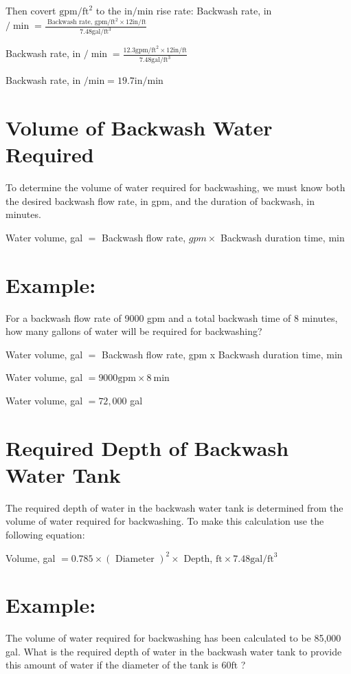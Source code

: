 \documentclass[10pt]{article}
\begin{document}
Then covert $\mathrm{gpm} / \mathrm{ft}^{2}$ to the $\mathrm{in} / \mathrm{min}$ rise rate: Backwash rate, in $/ \min =\frac{\text { Backwash rate, } \mathrm{gpm} / \mathrm{ft}^{2} \times 12 \mathrm{in} / \mathrm{ft}}{7.48 \mathrm{gal} / \mathrm{ft}^{3}}$

Backwash rate, in $/ \min =\frac{12.3 \mathrm{gpm} / \mathrm{ft}^{2} \times 12 \mathrm{in} / \mathrm{ft}}{7.48 \mathrm{gal} / \mathrm{ft}^{3}}$

Backwash rate, in $/ \mathrm{min}=19.7 \mathrm{in} / \mathrm{min}$

\section{Volume of Backwash Water Required}
To determine the volume of water required for backwashing, we must know both the desired backwash flow rate, in gpm, and the duration of backwash, in minutes.

Water volume, gal $=$ Backwash flow rate, $g p m \times$ Backwash duration time, min

\section{Example:}
For a backwash flow rate of 9000 gpm and a total backwash time of 8 minutes, how many gallons of water will be required for backwashing?

Water volume, gal $=$ Backwash flow rate, gpm x Backwash duration time, min

Water volume, gal $=9000 \mathrm{gpm} \times 8 \mathrm{~min}$

Water volume, gal $=72,000$ gal

\section{Required Depth of Backwash Water Tank}
The required depth of water in the backwash water tank is determined from the volume of water required for backwashing. To make this calculation use the following equation:

Volume, gal $=0.785 \times(\text { Diameter })^{2} \times$ Depth, $\mathrm{ft} \times 7.48 \mathrm{gal} / \mathrm{ft}^{3}$

\section{Example:}
The volume of water required for backwashing has been calculated to be 85,000 gal. What is the required depth of water in the backwash water tank to provide this amount of water if the diameter of the tank is $60 \mathrm{ft}$ ?
\end{document}
